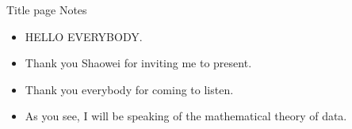 \begin{frame}
\titlepage
{}
\end{frame} 


\ifNotesnAll
\begin{frame}{Title page Notes}
\begin{itemize}
  \item HELLO EVERYBODY. 
  \item Thank you Shaowei for inviting me to present.
  \item Thank you everybody for coming to listen.
  \item As you see, I will be speaking of the mathematical theory of data.
\end{itemize}
\end{frame}
\fi


